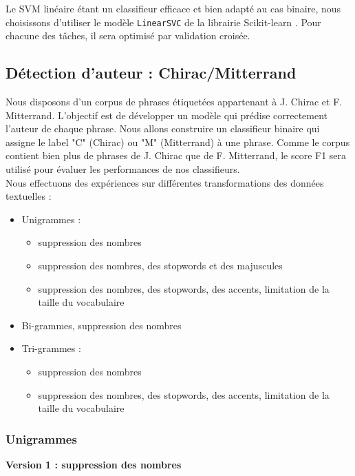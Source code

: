\documentclass[a4paper]{article}
\begin{document}
Le SVM linéaire étant un classifieur efficace et bien adapté au cas binaire,
nous choisissons d'utiliser le modèle \texttt{LinearSVC} de la librairie
Scikit-learn \cite{scikit}. Pour chacune des tâches, il sera optimisé par
validation croisée.

\subsection{Détection d'auteur : Chirac/Mitterrand}

Nous disposons d'un corpus de phrases étiquetées appartenant à J. Chirac et
F. Mitterrand. L'objectif est de développer un modèle qui prédise correctement
l'auteur de chaque phrase. Nous allons construire un classifieur binaire qui
assigne le label "C" (Chirac) ou "M" (Mitterrand) à une phrase. Comme le corpus
contient bien plus de phrases de J. Chirac que de F. Mitterrand, le score F1 sera
utilisé pour évaluer les performances de nos classifieurs.\\

Nous effectuons des expériences sur différentes transformations des données textuelles :
\begin{itemize}
    \item Unigrammes :
    \begin{itemize} 
        \item suppression des nombres
        \item suppression des nombres, des stopwords et des majuscules
        \item suppression des nombres, des stopwords, des accents, limitation de la taille du
            vocabulaire
    \end{itemize}
    \item Bi-grammes, suppression des nombres
    \item Tri-grammes :
    \begin{itemize}
        \item suppression des nombres
        \item suppression des nombres, des stopwords, des accents,
            limitation de la taille du vocabulaire
    \end{itemize}
\end{itemize}

\subsubsection{Unigrammes}

\textbf{Version 1 : suppression des nombres}
\end{document}
